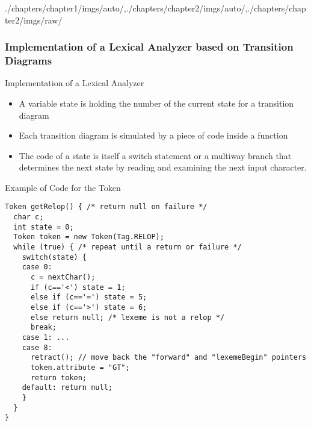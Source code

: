 \begin{graphicspathcontext}{{./chapters/chapter1/imgs/auto/},{./chapters/chapter2/imgs/auto/},{./chapters/chapter2/imgs/raw/}}
\begin{bibunit}[apalike]
\subsubsection{Implementation of a Lexical Analyzer based on Transition Diagrams}
\subsubsectiontableofcontentslide

\begin{frame}{Implementation of a Lexical Analyzer}
	\begin{itemize}
	\item A variable state is holding the number of the current state for a transition diagram
	\vspace{.5cm}
	\item Each transition diagram is simulated by a piece of code inside a function
	\vspace{.5cm}
	\item The code of a state is itself a switch statement or a multiway branch that determines the next state by reading and examining the next input character.
	\end{itemize}
\end{frame}

\begin{frame}[t,fragile]{Example of Code for the Token }
	\begin{lstlisting}[style=lststyle-java]
Token getRelop() { /* return null on failure */
  char c;
  int state = 0;
  Token token = new Token(Tag.RELOP);
  while (true) { /* repeat until a return or failure */
    switch(state) {
    case 0: 
      c = nextChar();
      if (c=='<') state = 1;
      else if (c=='=') state = 5;
      else if (c=='>') state = 6;
      else return null; /* lexeme is not a relop */
      break;
    case 1: ...
    case 8:
      retract(); // move back the "forward" and "lexemeBegin" pointers
      token.attribute = "GT";
      return token;
    default: return null;
    }
  }
}
	\end{lstlisting}
\end{frame}


\end{bibunit}
\end{graphicspathcontext}

